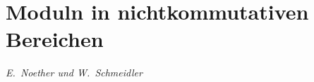 \documentclass[11pt,a4paper]{article}
\theoremstyle{plain}
\theoremstyle{definition}
\begin{document}
\renewenvironment{noetherpaper}[4]{\newpage\section*{#1}\addcontentsline{toc}{section}{#1}\par\smallskip}{\par\medskip}


\setcounter{section}{8}
\section*{Moduln in nichtkommutativen Bereichen}
\textit{E.~Noether und W.~Schmeidler}

\vspace{1em}
\end{document}
